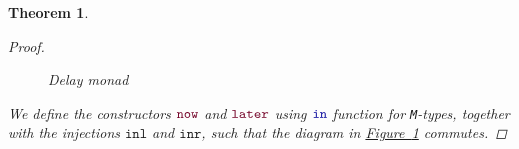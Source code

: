 \documentclass[twoside,11pt,openright]{report}
\theoremstyle{plain} %
\newtheorem{thm}{Theorem}[section]
\theoremstyle{definition}
\theoremstyle{remark}
\newcommand*{\figref}[1]{\hyperref[fig:#1]{Figure~\ref*{fig:#1}}}
\newcommand*{\type}[1]{\textcolor{magenta!90!black}{#1}}
\newcommand*{\function}[1]{\textcolor{blue!60!black}{\ensuremath{\mathtt{#1}}}}
\newcommand*{\constructor}[1]{\textcolor{purple!60!black}{\ensuremath{\mathtt{#1}}}}
\newcommand*{\typeformer}[1]{\ensuremath{\mathtt{#1}}}
\begin{document}
\begin{thm}
\begin{proof}
    \begin{figure}[h]
      \centering
      \caption{Delay monad}
      \label{fig:delay-monad}
    \end{figure}
    \noindent We define the constructors \(\constructor{now}\) and \(\constructor{later}\) using \(\function{in}\) function for \texttt{M}-types, together with the injections \(\mathtt{inl}\) and \(\mathtt{inr}\), such that the diagram in \figref{delay-monad} commutes.
  \end{proof}
\end{thm}
\end{document}
